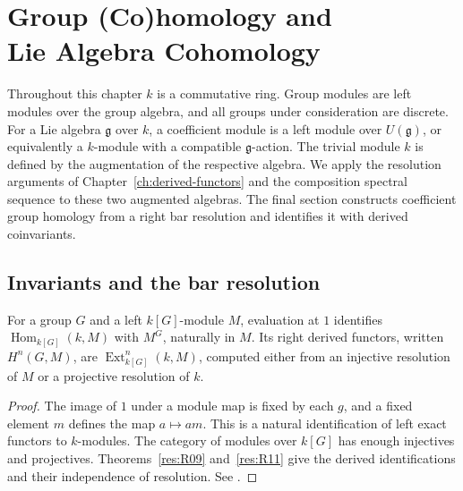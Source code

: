 \chapter[Group (Co)homology and Lie Cohomology]
  {Group (Co)homology and\\Lie Algebra Cohomology}
\label{ch:group-and-lie}

Throughout this chapter \(k\) is a commutative ring. Group modules are left
modules over the group algebra, and all groups under consideration are
discrete. For a Lie algebra \(\mathfrak g\) over \(k\), a coefficient
module is a left module over \(U(\mathfrak g)\), or equivalently a
\(k\)-module with a compatible \(\mathfrak g\)-action. The trivial module
\(k\) is defined by the augmentation of the respective algebra. We
apply the resolution arguments of Chapter~\ref{ch:derived-functors} and
the composition spectral sequence to these two augmented algebras.
The final section constructs coefficient group homology from a right
bar resolution and identifies it with derived coinvariants.

\section{Invariants and the bar resolution}

\begin{proposition}\label{res:A01}
For a group \(G\) and a left \(k[G]\)-module \(M\), evaluation at \(1\)
identifies \(\operatorname{Hom}_{k[G]}(k,M)\) with \(M^G\), naturally in
\(M\). Its right derived functors, written \(H^n(G,M)\), are
\(\operatorname{Ext}_{k[G]}^n(k,M)\), computed either from an injective
resolution of \(M\) or a projective resolution of \(k\).
\end{proposition}

\begin{proof}
The image of \(1\) under a module map is fixed by each \(g\), and a
fixed element \(m\) defines the map \(a\mapsto am\). This is a natural
identification of left exact functors to \(k\)-modules. The category
of modules over \(k[G]\) has enough injectives and projectives.
Theorems~\ref{res:R09} and~\ref{res:R11} give the derived
identifications and their independence of resolution.
See \cite[Section 6.1]{weibel}.
\end{proof}

